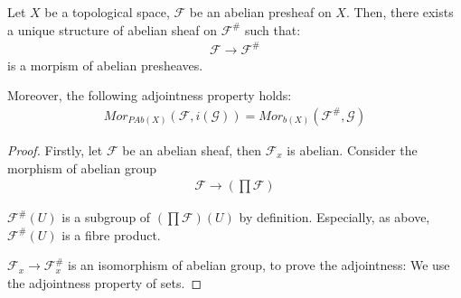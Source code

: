 \documentclass[Total.tex]{subfiles}
\begin{document}
					\begin{lemma}
						Let $X$ be a topological space, $\mathcal{F}$ be an abelian presheaf on $X$. Then, there exists a unique structure of abelian sheaf on $\mathcal{F}^\#$ such that:
						\begin{gather*}
							\mathcal{F}\rightarrow \mathcal{F}^\#
						\end{gather*}
						is a morpism of abelian presheaves.
						
						Moreover, the following adjointness property holds:
						\begin{gather*}
							Mor_{PAb(X)}(\mathcal{F},i(\mathcal{G}))=Mor_{b(X)}(\mathcal{F}^\#,\mathcal{G})
						\end{gather*}
					\end{lemma}
					\begin{proof}
						Firstly, let $\mathcal{F}$ be an abelian sheaf, then $\mathcal{F}_x$ is abelian. Consider the morphism of abelian group
						\begin{gather*}
							\mathcal{F}\rightarrow (\prod \mathcal{F})
						\end{gather*}
						
						$\mathcal{F}^\#(U)$ is a subgroup of $(\prod \mathcal{F})(U)$ by definition. Especially, as above, $\mathcal{F}^\#(U)$ is a fibre product. 
						
						$\mathcal{F}_x\rightarrow \mathcal{F}^\#_x$ is an isomorphism of abelian group, to prove the adjointness: We use the adjointness property of sets.
					\end{proof}
\end{document}
